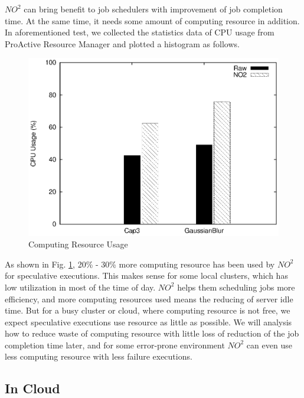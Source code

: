 $NO^2$ can bring benefit to job schedulers with improvement of job completion time. At the same time, it needs some amount of computing resource in addition. In aforementioned test, we collected the statistics data of CPU usage from ProActive Resource Manager and plotted a histogram as follows.

\begin{figure}
\centering
\includegraphics[width=0.9\columnwidth]{figures/resource_usage.eps}
\caption{Computing Resource Usage}
\label{figure:resourceusage}
\end{figure}

As shown in Fig.  \ref{figure:resourceusage}, 20\% - 30\% more computing resource has been used by $NO^2$ for speculative executions. This makes sense for some local clusters, which has low utilization in most of the time of day. $NO^2$ helps them scheduling jobs more efficiency, and more computing resources used means the reducing of server idle time. But for a busy cluster or cloud, where computing resource is not free, we expect speculative executions use resource as little as possible. We will analysis how to reduce waste of computing resource with little loss of reduction of the job completion time later, and for some error-prone environment $NO^2$ can even use less computing resource with less failure executions.

\subsection{In Cloud}


